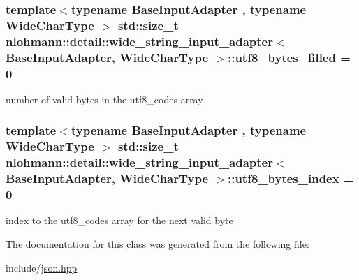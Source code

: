 \subsubsection[{\texorpdfstring{utf8\+\_\+bytes\+\_\+filled}{utf8_bytes_filled}}]{\setlength{\rightskip}{0pt plus 5cm}template$<$typename Base\+Input\+Adapter , typename Wide\+Char\+Type $>$ std\+::size\+\_\+t {\bf nlohmann\+::detail\+::wide\+\_\+string\+\_\+input\+\_\+adapter}$<$ Base\+Input\+Adapter, Wide\+Char\+Type $>$\+::utf8\+\_\+bytes\+\_\+filled = 0\hspace{0.3cm}{\ttfamily [private]}}\hypertarget{classnlohmann_1_1detail_1_1wide__string__input__adapter_a8966550e615e62978b01d3a252b9c649}{}\label{classnlohmann_1_1detail_1_1wide__string__input__adapter_a8966550e615e62978b01d3a252b9c649}


number of valid bytes in the utf8\+\_\+codes array 

\subsubsection[{\texorpdfstring{utf8\+\_\+bytes\+\_\+index}{utf8_bytes_index}}]{\setlength{\rightskip}{0pt plus 5cm}template$<$typename Base\+Input\+Adapter , typename Wide\+Char\+Type $>$ std\+::size\+\_\+t {\bf nlohmann\+::detail\+::wide\+\_\+string\+\_\+input\+\_\+adapter}$<$ Base\+Input\+Adapter, Wide\+Char\+Type $>$\+::utf8\+\_\+bytes\+\_\+index = 0\hspace{0.3cm}{\ttfamily [private]}}\hypertarget{classnlohmann_1_1detail_1_1wide__string__input__adapter_a2a1884713fedff6c17cdbbe63070d1ac}{}\label{classnlohmann_1_1detail_1_1wide__string__input__adapter_a2a1884713fedff6c17cdbbe63070d1ac}


index to the utf8\+\_\+codes array for the next valid byte 



The documentation for this class was generated from the following file\+:\begin{DoxyCompactItemize}
\item 
include/\hyperlink{json_8hpp}{json.\+hpp}\end{DoxyCompactItemize}
